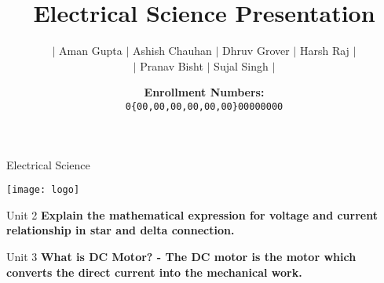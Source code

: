 \documentclass[11pt]{beamer}
\title{Electrical Science Presentation}
\author[Aman, Ashish, Dhruv...]{\(|\) Aman Gupta \(|\) Ashish Chauhan \(|\) Dhruv Grover \(|\) Harsh Raj \(|\)\\
    \(|\) Pranav Bisht \(|\) Sujal Singh \(|\)}
\date[Harsh, Pranav, Sujal]{\textbf{Enrollment Numbers:\\}\texttt{0\{00,00,00,00,00,00\}00000000}}
\begin{document}
    \begin{frame}{Electrical Science}
        \begin{center}
            \texttt{[image: logo]}
        \end{center}\vspace*{-10pt}
        \maketitle
    \end{frame}

    \begin{frame}[t]{Unit 2}
        \textbf{\large Explain the mathematical expression for voltage and current relationship in star and delta
        connection.}
    \end{frame}

    \begin{frame}[t]{Unit 3}
        \textbf{\large What is DC Motor? - The DC motor is the motor which converts the direct current into the
        mechanical work.}
    \end{frame}
\end{document}
